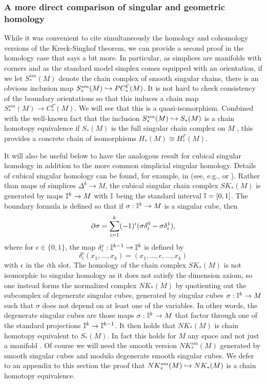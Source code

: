 \subsubsection{A more direct comparison of singular and geometric homology}

While it was convenient to cite simultaneously the homology and cohomology versions of the Kreck-Singhof theorem, we can provide a second proof in the homology case that says a bit more. In particular, as simplices are manifolds with corners and as the standard model simplex comes equipped with an orientation, if we let $S^{sm}_*(M)$ denote the chain complex of smooth singular chains, there is an obvious inclusion map $S^{sm}_*(M)\hookrightarrow PC_*^\Gamma(M)$. It is not hard to check consistency of the boundary orientations so that this induces a chain map $S^{sm}_*(M) \to C_*^\Gamma(M)$. We will see that this is a quasi-isomorphism. Combined with the well-known fact that the inclusion $S^{sm}_*(M)\hookrightarrow S_*(M)$ is a chain homotopy equivalence if $S_*(M)$ is the full singular chain complex on $M$ \cite[Theorem 18.7]{Lee13}, this provides a concrete chain of isomorphisms $H_*(M) \cong H_*^\Gamma(M)$.

It will also be useful below to have the analogous result for cubical singular homology in addition to the more common simplicial singular homology. Details of cubical singular homology can be found, for example, in (see, e.g., \cite{Mas91} or \cite[Section 8.3]{HW60}). Rather than maps of simplices $\Delta^k \to M$, the cubical singular chain complex $SK_*(M)$ is generated by maps $\mathbb{I}^k \to M$ with $\mathbb{I}$ being the standard interval $\mathbb{I} = [0,1]$. The boundary formula is defined so that if $\sigma: \mathbb{I}^k \to M$ is a singular cube, then
\begin{equation}\label{E: cube bd}
\partial \sigma = \sum_{i = 1}^k (-1)^i(\sigma \delta_i^0-\sigma \delta^1_i),
\end{equation}
where for $\epsilon\in\{0,1\}$, the map $\delta_i^\epsilon:\mathbb{I}^{k-1} \to \mathbb{I}^k$ is defined by
$$\delta_i^\epsilon(x_1,\ldots,x_k) = (x_1,\ldots,\epsilon,\ldots, x_k)$$
with $\epsilon$ in the $i$th slot. The homology of the chain complex $SK_*(M)$ is not isomorphic to singular homology as it does not satisfy the dimension axiom, so one instead forms the normalized complex $NK_*(M)$ by quotienting out the subcomplex of degenerate singular cubes, generated by singular cubes $\sigma:\mathbb{I}^k \to M$ such that $\sigma$ does not depend on at least one of the variables. In other words, the degenerate singular cubes are those maps $\sigma:\mathbb{I}^k \to M$ that factor through one of the standard projections $\mathbb{I}^k \to \mathbb{I}^{k-1}$. It then holds that $NK_*(M)$ is chain homotopy equivalent to $S_*(M)$. In fact this holds for $M$ any space and not just a manifold \cite[Theorem 8.4.7]{HW60}. Of course we will need the smooth version $NK^{sm}_*(M)$ generated by smooth singular cubes and modulo degenerate smooth singular cubes. We defer to an appendix to this section the proof that $NK^{sm}_*(M)\hookrightarrow NK_*(M)$ is a chain homotopy equivalence.





